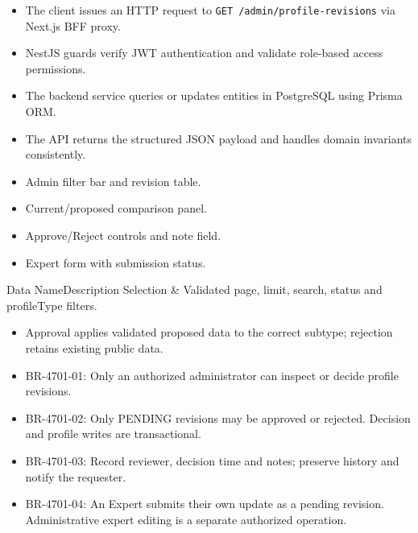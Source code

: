 \begin{itemize}[leftmargin=1.6em,topsep=3pt,itemsep=2pt,parsep=0pt,label=$\bullet$]
    \item The client issues an HTTP request to \texttt{GET /\allowbreak{}admin/\allowbreak{}profile-\allowbreak{}revisions} via Next.js BFF proxy.
    \item NestJS guards verify JWT authentication and validate role-based access permissions.
    \item The backend service queries or updates entities in PostgreSQL using Prisma ORM.
    \item The API returns the structured JSON payload and handles domain invariants consistently.
\end{itemize}

\begin{itemize}[leftmargin=1.6em,topsep=3pt,itemsep=2pt,parsep=0pt,label=$\bullet$]
    \item Admin filter bar and revision table.
    \item Current/proposed comparison panel.
    \item Approve/Reject controls and note field.
    \item Expert form with submission status.
\end{itemize}


\begin{specdatatable}{Data Name}{Description}
Selection & Validated page, limit, search, status and profileType filters.\\ \hline
\end{specdatatable}

\begin{itemize}[leftmargin=1.6em,topsep=3pt,itemsep=2pt,parsep=0pt,label=$\bullet$]
    \item Approval applies validated proposed data to the correct subtype; rejection retains existing public data.
\end{itemize}

\begin{itemize}[leftmargin=1.6em,topsep=3pt,itemsep=2pt,parsep=0pt,label=$\bullet$]\brrulelist
    \item BR-4701-01: Only an authorized administrator can inspect or decide profile revisions.
    \item BR-4701-02: Only PENDING revisions may be approved or rejected. Decision and profile writes are transactional.
    \item BR-4701-03: Record reviewer, decision time and notes; preserve history and notify the requester.
    \item BR-4701-04: An Expert submits their own update as a pending revision. Administrative expert editing is a separate authorized operation.
\end{itemize}

